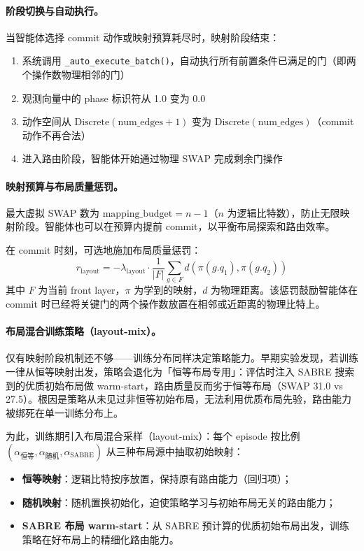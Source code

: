 \paragraph{阶段切换与自动执行。} 当智能体选择 commit 动作或映射预算耗尽时，映射阶段结束：
\begin{enumerate}
  \item 系统调用 \texttt{\_auto\_execute\_batch()}，自动执行所有前置条件已满足的门（即两个操作数物理相邻的门）
  \item 观测向量中的 phase 标识符从 1.0 变为 0.0
  \item 动作空间从 $\text{Discrete}(\text{num\_edges} + 1)$ 变为 $\text{Discrete}(\text{num\_edges})$（commit 动作不再合法）
  \item 进入路由阶段，智能体开始通过物理 SWAP 完成剩余门操作
\end{enumerate}

\paragraph{映射预算与布局质量惩罚。} 最大虚拟 SWAP 数为 $\text{mapping\_budget} = n - 1$（$n$ 为逻辑比特数），防止无限映射阶段。智能体也可以在预算内提前 commit，以平衡布局探索和路由效率。

在 commit 时刻，可选地施加布局质量惩罚：
\[
r_{\text{layout}} = -\lambda_{\text{layout}} \cdot \frac{1}{|F|} \sum_{g \in F} d(\pi(g.q_1), \pi(g.q_2))
\]
其中 $F$ 为当前 front layer，$\pi$ 为学到的映射，$d$ 为物理距离。该惩罚鼓励智能体在 commit 时已经将关键门的两个操作数放置在相邻或近距离的物理比特上。

\paragraph{布局混合训练策略（layout-mix）。} 仅有映射阶段机制还不够——训练分布同样决定策略能力。早期实验发现，若训练一律从恒等映射出发，策略会退化为「恒等布局专用」：评估时注入 SABRE 搜索到的优质初始布局做 warm-start，路由质量反而劣于恒等布局（SWAP 31.0 vs 27.5）。根因是策略从未见过非恒等初始布局，无法利用优质布局先验，路由能力被绑死在单一训练分布上。

为此，训练期引入布局混合采样（layout-mix）：每个 episode 按比例 $(\alpha_{\text{恒等}}, \alpha_{\text{随机}}, \alpha_{\text{SABRE}})$ 从三种布局源中抽取初始映射：
\begin{itemize}
  \item \textbf{恒等映射}：逻辑比特按序放置，保持原有路由能力（回归项）；
  \item \textbf{随机映射}：随机置换初始化，迫使策略学习与初始布局无关的路由能力；
  \item \textbf{SABRE 布局 warm-start}：从 SABRE 预计算的优质初始布局出发，训练策略在好布局上的精细化路由能力。
\end{itemize}

